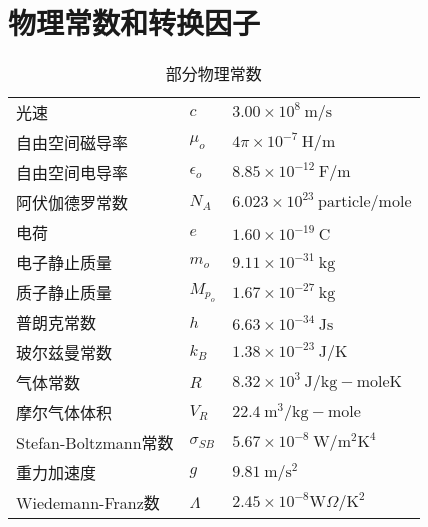 \appendix      
\renewcommand{\appendixname}{Appendix~\Alph{section}}
\setcounter{table}{0}   %
\renewcommand{\thetable}{A\arabic{table}}

\section{物理常数和转换因子}
\begin{table}[htbp]\small
\centering
\caption{部分物理常数}%
\begin{tabular}{lll}

光速 & $c$ & $3.00\times10^8\ \mathrm{m/s}$ \\ 
自由空间磁导率 & $\mu_o$ & $4\pi\times10^{-7}\ \mathrm{H/m}$ \\ 
自由空间电导率 & $\epsilon_o$ & $8.85\times10^{-12}\ \mathrm{F/m}$ \\ 
阿伏伽德罗常数 & $N_A $& $6.023\times10^{23}\ \mathrm{particle/mole}$ \\ 
电荷 & $e$ & $1.60\times10^{-19}\ \mathrm{C}$ \\
电子静止质量 & $m_o$ & $9.11\times10^{-31}\ \mathrm{kg}$ \\ 
质子静止质量 & $M_{p_o}$ & $1.67\times10^{-27}\ \mathrm{kg}$ \\ 
普朗克常数& $h$ & $6.63\times10^{-34}\ \mathrm{Js}$ \\
玻尔兹曼常数& $k_B$ & $1.38\times10^{-23}\ \mathrm{J/K}$ \\
气体常数 & $R$ & $8.32\times10^3\ \mathrm{J/kg-mole K}$ \\ 
摩尔气体体积 & $V_R$ & $22.4\ \mathrm{m^3/kg-mole}$ \\ 
Stefan-Boltzmann常数& $\sigma_{SB}$ & $5.67\times10^{-8}\ \mathrm{W/m^2K^4}$ \\ 
重力加速度& $g$ & $9.81\ \mathrm{m/s^2}$ \\ 
Wiedemann-Franz数& $\Lambda$ & $2.45\times10^{-8} \mathrm{W}\Omega\mathrm{/K^2}$ \\ 
\end{tabular}
\end{table}
\newpage

